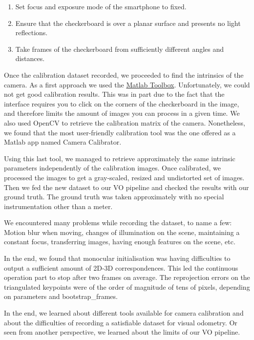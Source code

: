 \begin{enumerate}
	\item Set focus and exposure mode of the smartphone to fixed.
	\item Ensure that the checkerboard is over a planar surface and presents no light reflections.
	\item Take frames of the checkerboard from sufficiently different angles and distances.
\end{enumerate}

Once the calibration dataset recorded, we proceeded to find the intrinsics of the camera.
As a first approach we used the \href{https://www.vision.caltech.edu/bouguetj/calib_doc/}{Matlab Toolbox}.
Unfortunately, we could not get good calibration results.
This was in part due to the fact that the interface requires you to click on the
corners of the checkerboard in the image, and therefore limits the amount of images you can process in a given time.
We also used OpenCV to retrieve the calibration matrix of the camera. Nonetheless, we found that the most user-friendly
calibration tool was the one offered as a Matlab app named Camera Calibrator.

Using this last tool, we managed to retrieve approximately the same intrinsic parameters independently of the calibration images.
Once calibrated, we processed the images to get a gray-scaled, resized and undistorted set of images. Then we fed the new
dataset to our VO pipeline and checked the results with our ground truth.
The ground truth was taken approximately with no special instrumentation other than a meter.

We encountered many problems while recording the dataset, to name a few: Motion blur when moving, changes of illumination on the scene,
maintaining a constant focus, transferring images, having enough features on the scene, etc.

In the end, we found that monocular initialisation was having difficulties to output a sufficient amount of 2D-3D correspondences.
This led the continuous operation part to stop after two frames on average. The reprojection errors on the triangulated keypoints were of
the order of magnitude of tens of pixels, depending on parameters and bootstrap\_frames.

In the end, we learned about different tools available for camera calibration and about the difficulties of recording a satisfiable dataset
for visual odometry. Or seen from another perspective, we learned about the limits of our VO pipeline.

